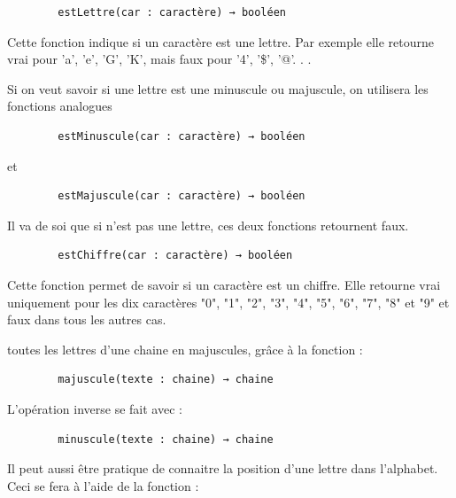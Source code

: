 \documentclass[11pt,a4paper]{article}
\begin{document}
            \par
        \begin{verbatim}
        estLettre(car : caractère) → booléen
      \end{verbatim}
        Cette fonction indique si un caract\`ere est une lettre. Par exemple elle retourne vrai pour 'a',
        'e', 'G', 'K', mais faux pour '4', '\$', '@'. . .
      
            \par
        
        Si on veut savoir si une lettre est une minuscule ou majuscule, on utilisera les fonctions
        analogues
      
            \par
        \begin{verbatim}
        estMinuscule(car : caractère) → booléen
      \end{verbatim}
        et
      
            \par
        \begin{verbatim}
        estMajuscule(car : caractère) → booléen
      \end{verbatim}
        Il va de soi que si \verb@car@ n'est pas une lettre, ces deux fonctions retournent faux.
      
            \par
        \begin{verbatim}
        estChiffre(car : caractère) → booléen
      \end{verbatim}
        Cette fonction permet de savoir si un caract\`ere est un chiffre. Elle retourne vrai uniquement
        pour les dix caract\`eres "0", "1", "2", "3", "4", "5", "6", "7", "8" et "9" et faux dans tous les autres
        cas.
      
            \par
        toutes les lettres d'une chaine en majuscules, gr\^ace \`a la fonction :
      
            \par
        \begin{verbatim}
        majuscule(texte : chaine) → chaine
      \end{verbatim}
        L'op\'eration inverse se fait avec :
      
            \par
        \begin{verbatim}
        minuscule(texte : chaine) → chaine
      \end{verbatim}
        Il peut aussi \^etre pratique de connaitre la position d'une lettre dans l'alphabet. Ceci se fera
        \`a l'aide de la fonction :
      
\end{document}

